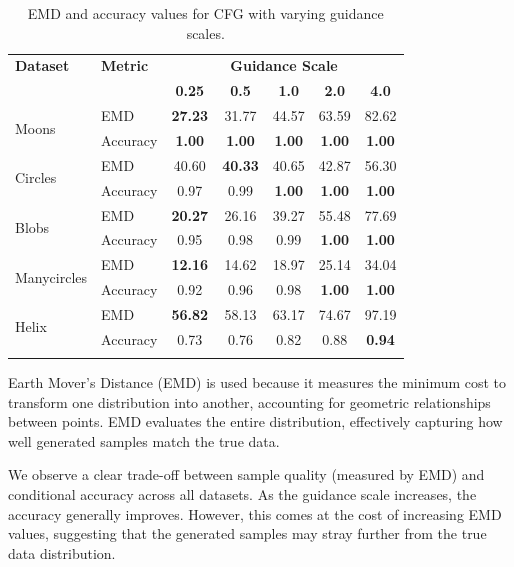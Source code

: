 \documentclass[11pt]{article}
\begin{document}
\begin{longtable}{|l|l|c|c|c|c|c|}
    \hline
    \textbf{Dataset} & \textbf{Metric} & \multicolumn{5}{c|}{\textbf{Guidance Scale}} \\
    \cline{3-7}
    & & \textbf{0.25} & \textbf{0.5} & \textbf{1.0} & \textbf{2.0} & \textbf{4.0} \\
    \hline
    \multirow{2}{*}{Moons} & EMD & \textbf{27.23} & 31.77 & 44.57 & 63.59 & 82.62 \\
    \cline{2-7}
    & Accuracy & \textbf{1.00} & \textbf{1.00} & \textbf{1.00} & \textbf{1.00} & \textbf{1.00} \\
    \hline
    \multirow{2}{*}{Circles} & EMD & 40.60 & \textbf{40.33} & 40.65 & 42.87 & 56.30 \\
    \cline{2-7}
    & Accuracy & 0.97 & 0.99 & \textbf{1.00} & \textbf{1.00} & \textbf{1.00} \\
    \hline
    \multirow{2}{*}{Blobs} & EMD & \textbf{20.27} & 26.16 & 39.27 & 55.48 & 77.69 \\
    \cline{2-7}
    & Accuracy & 0.95 & 0.98 & 0.99 & \textbf{1.00} & \textbf{1.00} \\
    \hline
    \multirow{2}{*}{Manycircles} & EMD & \textbf{12.16} & 14.62 & 18.97 & 25.14 & 34.04 \\
    \cline{2-7}
    & Accuracy & 0.92 & 0.96 & 0.98 & \textbf{1.00} & \textbf{1.00} \\
    \hline
    \multirow{2}{*}{Helix} & EMD & \textbf{56.82} & 58.13 & 63.17 & 74.67 & 97.19 \\
    \cline{2-7}
    & Accuracy & 0.73 & 0.76 & 0.82 & 0.88 & \textbf{0.94} \\
    \hline
    \caption{EMD and accuracy values for CFG with varying guidance scales.}
\end{longtable}
\label{tab:cfg_results}

Earth Mover's Distance (EMD) is used because it measures the minimum cost to transform one distribution into another, accounting for geometric relationships between points. EMD evaluates the entire distribution, effectively capturing how well generated samples match the true data.

We observe a clear trade-off between sample quality (measured by EMD) and conditional accuracy across all datasets. As the guidance scale increases, the accuracy generally improves. However, this comes at the cost of increasing EMD values, suggesting that the generated samples may stray further from the true data distribution.
\end{document}

